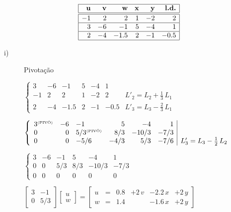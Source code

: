 \[
 \begin{array}{|rrrrrr|}
	\hline
	\textbf{u} & \textbf{v} & \textbf{w} & \textbf{x} & \textbf{y} & \textbf{l.d.}\\
	\hline \hline
	-1 & 2 & 2 & 1 & -2 & 2\\
	\hline
	3 & -6 & -1 & 5 & -4 & 1\\
	\hline
	2 & -4 & -1.5 & 2 & -1 & -0.5\\
	\hline
 \end{array}
\]

\begin{description}

\item[i)] Pivotação

\hspace*{2 cm}
$
 \left\{
  \begin{array}{rrrrrr|r}
   3 & -6 & -1 & 5 & -4 & 1 &\\
   -1 & 2 & 2 & 1 & -2 & 2 & L'_2 = L_2 + \frac{1}{3} \, L_1\\
   2 & -4 & -1.5 & 2 & -1 & -0.5 & L'_3 = L_3 - \frac{2}{3} \, L_1
  \end{array}
 \right.
$

\hspace*{2 cm}
$
 \left\{
  \begin{array}{lrlrrr|c}
   3^{\mbox{\tiny{(PIVÔ)}}} & -6 & -1 & 5 & -4 & 1 &\\
   0 & 0 & 5/3^{\mbox{\tiny{(PIVÔ)}}} & 8/3 & - 10/3 & - 7/3 &\\
   0 & 0 & - 5/6 & - 4/3 & 5/3 & - 7/6 & L'_3 = L_3 - \frac{1}{2} \, L_2
  \end{array}
 \right.
$

\hspace*{2 cm}
$
 \left\{
  \begin{array}{rrrrrr}
   3 & -6 & -1 & 5 & -4 & 1\\
   0 & 0 & 5/3 & 8/3 & - 10/3 & - 7/3\\
   0 & 0 & 0 & 0 & 0 & 0
  \end{array}
 \right.
$

\hspace*{2 cm}
$
 \left[
  \begin{array}{cc}
   3 & -1\\
   0 & 5/3
  \end{array}
 \right]
 \left[
  \begin{array}{c}
   u\\
   w
  \end{array}
 \right]
 =
 \left[
  \begin{array}{cccccc}
   u & = & 0.8 & + 2 \, v & -2.2 \, x & + 2 \,y\\
   w & = & 1.4 &          & -1.6 \, x & + 2 \,y
  \end{array}
 \right]
$

\end{description}

